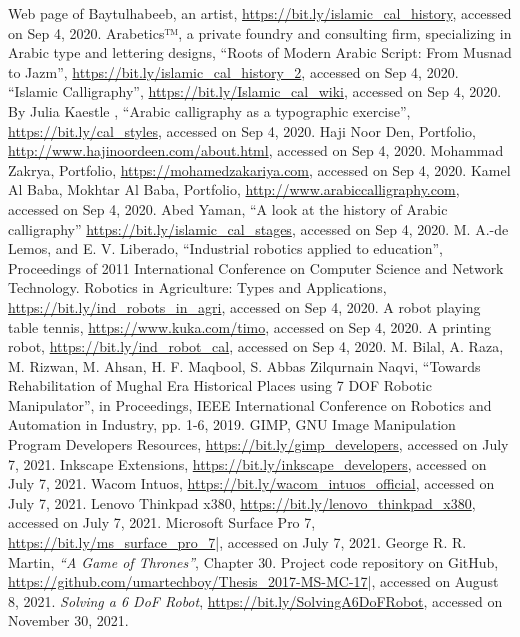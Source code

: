 \begin{thebibliography}{99}
 Web page of Baytulhabeeb, an artist, \url{https://bit.ly/islamic_cal_history}, accessed on Sep 4, 2020.
 Arabetics™, a private foundry and consulting firm, specializing in Arabic type and lettering designs, “Roots of Modern Arabic Script:  From Musnad to Jazm”, \url{https://bit.ly/islamic_cal_history_2}, accessed on Sep 4, 2020.
 “Islamic Calligraphy”, \url{https://bit.ly/Islamic_cal_wiki}, accessed on Sep 4, 2020.
 By Julia Kaestle , “Arabic calligraphy as a typographic exercise”, \url{https://bit.ly/cal_styles}, accessed on Sep 4, 2020.
 Haji Noor Den, Portfolio, \url{http://www.hajinoordeen.com/about.html}, accessed on Sep 4, 2020.
 Mohammad Zakrya, Portfolio, \url{https://mohamedzakariya.com}, accessed on Sep 4, 2020.
 Kamel Al Baba, Mokhtar Al Baba, Portfolio, \url{http://www.arabiccalligraphy.com}, accessed on Sep 4, 2020.
 Abed Yaman, “A look at the history of Arabic calligraphy” \url{https://bit.ly/islamic_cal_stages}, accessed on Sep 4, 2020.
 M. A.-de Lemos, and E. V. Liberado, “Industrial robotics applied to education”, Proceedings of 2011 International Conference on Computer Science and Network Technology.
 Robotics in Agriculture: Types and Applications, \url{https://bit.ly/ind_robots_in_agri}, accessed on Sep 4, 2020.
 A robot playing table tennis, \url{https://www.kuka.com/timo}, accessed on Sep 4, 2020.
 A printing robot, \url{https://bit.ly/ind_robot_cal}, accessed on Sep 4, 2020.
 M. Bilal, A. Raza, M. Rizwan, M. Ahsan, H. F. Maqbool, S. Abbas Zilqurnain Naqvi, “Towards Rehabilitation of Mughal Era Historical Places using 7 DOF Robotic Manipulator”, in Proceedings, IEEE International Conference on Robotics and Automation in Industry, pp. 1-6, 2019.
 GIMP, GNU Image Manipulation Program Developers Resources, \url{https://bit.ly/gimp_developers}, accessed on July 7, 2021.
 Inkscape Extensions, \url{https://bit.ly/inkscape_developers}, accessed on July 7, 2021.
 Wacom Intuos, \url{https://bit.ly/wacom_intuos_official}, accessed on July 7, 2021.
 Lenovo Thinkpad x380, \url{https://bit.ly/lenovo_thinkpad_x380}, accessed on July 7, 2021.
 Microsoft Surface Pro 7, \url{https://bit.ly/ms_surface_pro_7}|, accessed on July 7, 2021.
 George R. R. Martin, \emph{``A Game of Thrones''}, Chapter $30$.
 Project code repository on GitHub, \url{https://github.com/umartechboy/Thesis_2017-MS-MC-17}|, accessed on August 8, 2021.
 \emph{Solving a 6 DoF Robot}, \url{https://bit.ly/SolvingA6DoFRobot}, accessed on November 30, 2021.
    \end{thebibliography} 
